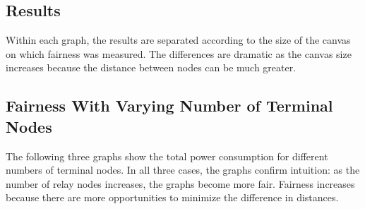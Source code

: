 \subsection{Results}

Within each graph, the results are separated according to the size of the canvas on which fairness was measured.  The differences are dramatic as the canvas size increases because the distance between nodes can be much greater.

\subsection{Fairness With Varying Number of Terminal Nodes}

The following three graphs show the total power consumption for different numbers of terminal nodes.  In all three cases, the graphs confirm intuition: as the number of relay nodes increases, the graphs become more fair.  Fairness increases because there are more opportunities to minimize the difference in distances.

